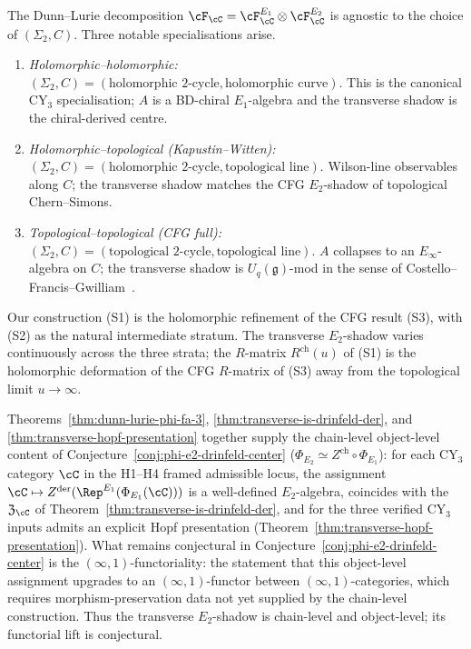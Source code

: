 \begin{remark}
\label{rem:three-dunn-lurie-specialisations}
The Dunn--Lurie decomposition $\cF_\cC = \cF^{E_1}_\cC \otimes
\cF^{E_2}_\cC$ is agnostic to the choice of $(\Sigma_2, C)$. Three
notable specialisations arise.
\begin{enumerate}[label=\textup{(S\arabic*)}]
 \item \emph{Holomorphic--holomorphic:} $(\Sigma_2, C) = (\text{holomorphic
 $2$-cycle}, \text{holomorphic curve})$. This is the canonical CY$_3$
 specialisation; $A$ is a BD-chiral $E_1$-algebra and the transverse
 shadow is the chiral-derived centre.
 \item \emph{Holomorphic--topological (Kapustin--Witten):} $(\Sigma_2, C)
 = (\text{holomorphic $2$-cycle}, \text{topological line})$. Wilson-line
 observables along $C$; the transverse shadow matches the CFG
 $E_2$-shadow of topological Chern--Simons.
 \item \emph{Topological--topological (CFG full):} $(\Sigma_2, C) =
 (\text{topological $2$-cycle}, \text{topological line})$. $A$
 collapses to an $E_\infty$-algebra on $C$; the transverse shadow is
 $U_q(\mathfrak g)$-mod in the sense of
 Costello--Francis--Gwilliam~\cite{CFG2026}.
\end{enumerate}
Our construction (S1) is the holomorphic refinement of the CFG result
(S3), with (S2) as the natural intermediate stratum. The transverse
$E_2$-shadow varies continuously across the three strata; the
$R$-matrix $R^{\mathrm{ch}}(u)$ of (S1) is the holomorphic deformation
of the CFG $R$-matrix of (S3) away from the topological limit
$u \to \infty$.
\end{remark}

\begin{remark}
\label{rem:central-conjecture-chain-level-inputs}
Theorems~\ref{thm:dunn-lurie-phi-fa-3}, \ref{thm:transverse-is-drinfeld-der},
and \ref{thm:transverse-hopf-presentation} together supply the
chain-level object-level content of
Conjecture~\ref{conj:phi-e2-drinfeld-center}
($\Phi_{E_2} \simeq Z^{\mathrm{ch}} \circ \Phi_{E_1}$): for each CY$_3$
category $\cC$ in the H1--H4 framed admissible locus, the assignment
$\cC \mapsto Z^{\mathrm{der}}(\Rep^{E_1}(\Phi_{E_1}(\cC)))$ is a
well-defined $E_2$-algebra, coincides with the
$\fZ_\cC$ of Theorem~\ref{thm:transverse-is-drinfeld-der}, and for
the three verified CY$_3$ inputs admits an explicit Hopf presentation
(Theorem~\ref{thm:transverse-hopf-presentation}). What remains
conjectural in Conjecture~\ref{conj:phi-e2-drinfeld-center} is the
$(\infty, 1)$-functoriality: the statement that this object-level
assignment upgrades to an $(\infty, 1)$-functor between
$(\infty, 1)$-categories, which requires morphism-preservation data
not yet supplied by the chain-level construction. Thus the transverse
$E_2$-shadow is chain-level and object-level; its functorial lift is
conjectural.
\end{remark}


